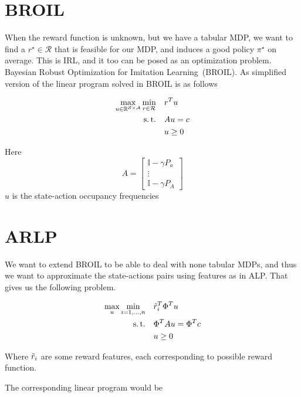 \documentclass{homework}
\newcommand{\real}{\mathbb{R}}
\newcommand{\states}{\mathcal{S}}
\newcommand{\actions}{\mathcal{A}}
\newcommand{\rewards}{\mathcal{R}}
\begin{document}
\section{BROIL}

When the reward function is unknown, but we have a tabular MDP, we want to find a $r^{\star} \in \rewards$ that is feasible for our MDP, and induces a good policy $\pi^{\star}$ on average. This is IRL, and it too can be posed as an optimization problem. Bayesian Robust Optimization for Imitation Learning~(BROIL)\cite{brown2020bayesian}. As simplified version of the linear program solved in BROIL is as follows 

\begin{equation}
\begin{aligned}
\max_{u\in \real^{\states \times \actions}} \min_{r \in \rewards}\quad &r^T u\\
\text{s.\,t.}\quad & Au = c\\
& u \ge 0\\
\end{aligned}
\end{equation}

Here 
$$A = \begin{bmatrix}\mathds{I} - \gamma P_a \\ \vdots \\ \mathds{I} - \gamma P_A\end{bmatrix}$$
$u$ is the state-action occupancy frequencies

\section{ARLP}

We want to extend BROIL to be able to deal with none tabular MDPs, and thus we want to approximate the state-actions pairs using features as in ALP. That gives us the following problem.

\begin{equation}
\begin{aligned}
\max_{u}\min_{i=1,\ldots, n} \quad & \Tilde{r}_i^T\Phi^T u\\
\text{s.\,t.} \quad & \Phi^T A u = \Phi^T c\\
& u \ge 0
\end{aligned}
\end{equation}

Where $\Tilde{r}_i$ are some reward features, each corresponding to possible reward function.

The corresponding linear program would be
\end{document}
